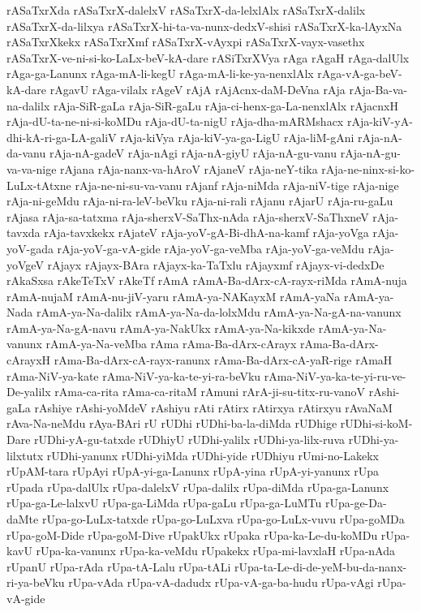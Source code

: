 {rASaTxrXda
rASaTxrX-dalelxV
rASaTxrX-da-lelxlAlx
rASaTxrX-dalilx
rASaTxrX-da-lilxya
rASaTxrX-hi-ta-va-nunx-dedxV-shisi
rASaTxrX-ka-lAyxNa
rASaTxrXkekx
rASaTxrXmf
rASaTxrX-vAyxpi
rASaTxrX-vayx-vasethx
rASaTxrX-ve-ni-si-ko-LaLx-beV-kA-dare
rASiTxrXVya
rAga
rAgaH
rAga-dalUlx
rAga-ga-Lanunx
rAga-mA-li-kegU
rAga-mA-li-ke-ya-nenxlAlx
rAga-vA-ga-beV-kA-dare
rAgavU
rAga-vilalx
rAgeV
rAjA
rAjAcnx-daM-DeVna
rAja
rAja-Ba-va-na-dalilx
rAja-SiR-gaLa
rAja-SiR-gaLu
rAja-ci-henx-ga-La-nenxlAlx
rAjacnxH
rAja-dU-ta-ne-ni-si-koMDu
rAja-dU-ta-nigU
rAja-dha-mARMshacx
rAja-kiV-yA-dhi-kA-ri-ga-LA-galiV
rAja-kiVya
rAja-kiV-ya-ga-LigU
rAja-liM-gAni
rAja-nA-da-vanu
rAja-nA-gadeV
rAja-nAgi
rAja-nA-giyU
rAja-nA-gu-vanu
rAja-nA-gu-va-va-nige
rAjana
rAja-nanx-va-hAroV
rAjaneV
rAja-neY-tika
rAja-ne-ninx-si-ko-LuLx-tAtxne
rAja-ne-ni-su-va-vanu
rAjanf
rAja-niMda
rAja-niV-tige
rAja-nige
rAja-ni-geMdu
rAja-ni-ra-leV-beVku
rAja-ni-rali
rAjanu
rAjarU
rAja-ru-gaLu
rAjasa
rAja-sa-tatxma
rAja-sherxV-SaThx-nAda
rAja-sherxV-SaThxneV
rAja-tavxda
rAja-tavxkekx
rAjateV
rAja-yoV-gA-Bi-dhA-na-kamf
rAja-yoVga
rAja-yoV-gada
rAja-yoV-ga-vA-gide
rAja-yoV-ga-veMba
rAja-yoV-ga-veMdu
rAja-yoVgeV
rAjayx
rAjayx-BAra
rAjayx-ka-TaTxlu
rAjayxmf
rAjayx-vi-dedxDe
rAkaSxsa
rAkeTeTxV
rAkeTf
rAmA
rAmA-Ba-dArx-cA-rayx-riMda
rAmA-nuja
rAmA-nujaM
rAmA-nu-jiV-yaru
rAmA-ya-NAKayxM
rAmA-yaNa
rAmA-ya-Nada
rAmA-ya-Na-dalilx
rAmA-ya-Na-da-lolxMdu
rAmA-ya-Na-gA-na-vanunx
rAmA-ya-Na-gA-navu
rAmA-ya-NakUkx
rAmA-ya-Na-kikxde
rAmA-ya-Na-vanunx
rAmA-ya-Na-veMba
rAma
rAma-Ba-dArx-cArayx
rAma-Ba-dArx-cArayxH
rAma-Ba-dArx-cA-rayx-ranunx
rAma-Ba-dArx-cA-yaR-rige
rAmaH
rAma-NiV-ya-kate
rAma-NiV-ya-ka-te-yi-ra-beVku
rAma-NiV-ya-ka-te-yi-ru-ve-De-yalilx
rAma-ca-rita
rAma-ca-ritaM
rAmuni
rArA-ji-su-titx-ru-vanoV
rAshi-gaLa
rAshiye
rAshi-yoMdeV
rAshiyu
rAti
rAtirx
rAtirxya
rAtirxyu
rAvaNaM
rAva-Na-neMdu
rAya-BAri
rU
rUDhi
rUDhi-ba-la-diMda
rUDhige
rUDhi-si-koM-Dare
rUDhi-yA-gu-tatxde
rUDhiyU
rUDhi-yalilx
rUDhi-ya-lilx-ruva
rUDhi-ya-lilxtutx
rUDhi-yanunx
rUDhi-yiMda
rUDhi-yide
rUDhiyu
rUmi-no-Lakekx
rUpAM-tara
rUpAyi
rUpA-yi-ga-Lanunx
rUpA-yina
rUpA-yi-yanunx
rUpa
rUpada
rUpa-dalUlx
rUpa-dalelxV
rUpa-dalilx
rUpa-diMda
rUpa-ga-Lanunx
rUpa-ga-Le-lalxvU
rUpa-ga-LiMda
rUpa-gaLu
rUpa-ga-LuMTu
rUpa-ge-Da-daMte
rUpa-go-LuLx-tatxde
rUpa-go-LuLxva
rUpa-go-LuLx-vuvu
rUpa-goMDa
rUpa-goM-Dide
rUpa-goM-Dive
rUpakUkx
rUpaka
rUpa-ka-Le-du-koMDu
rUpa-kavU
rUpa-ka-vanunx
rUpa-ka-veMdu
rUpakekx
rUpa-mi-lavxlaH
rUpa-nAda
rUpanU
rUpa-rAda
rUpa-tA-Lalu
rUpa-tALi
rUpa-ta-Le-di-de-yeM-bu-da-nanx-ri-ya-beVku
rUpa-vAda
rUpa-vA-dadudx
rUpa-vA-ga-ba-hudu
rUpa-vAgi
rUpa-vA-gide
}
